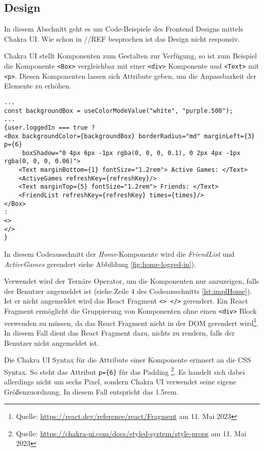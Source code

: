 \subsection{Design}
\label{sec:Design}
In diesem Abschnitt geht es um Code-Beispiele des Frontend Designs mittels Chakra UI.  Wie schon in //REF besprochen ist das Design nicht responsiv.

Chakra UI stellt Komponenten zum Gestalten zur Verfügung, so ist zum Beispiel die Komponente \verb|<Box>| vergleichbar mit einer \verb|<div>| Komponente und \verb|<Text>| mit \verb|<p>|. Diesen Komponenten lassen sich Attribute geben, um die Anpassbarkeit der Elemente zu erhöhen.

\begin{lstlisting}[style=codeStyle, caption={Darstellung der \textit{Friendlist} und \textit{ActiveGames} Komponenten in der \textit{Home}-Komponente}, label={lst:impl-Home}]
...
const backgroundBox = useColorModeValue("white", "purple.500");
...
{user.loggedIn === true ?
<Box backgroundColor={backgroundBox} borderRadius="md" marginLeft={3} p={6}
     boxShadow="0 4px 6px -1px rgba(0, 0, 0, 0.1), 0 2px 4px -1px rgba(0, 0, 0, 0.06)">
    <Text marginBottom={1} fontSize="1.2rem"> Active Games: </Text>
    <ActiveGames refreshKey={refreshKey}/>
    <Text marginTop={5} fontSize="1.2rem"> Friends: </Text>
    <FriendList refreshKey={refreshKey} times={times}/>
</Box>
:
<>
</>
}
\end{lstlisting}

In diesem Codeausschnitt der \textit{Home}-Komponente wird die \textit{FriendList} und \textit{ActiveGames} gerendert siehe Abbildung \ref{fig:home-logged-in}).

Verwendet wird der Ternäre Operator, um die Komponenten nur anzuzeigen, falls der Benutzer angemeldet ist (siehe Zeile 4 des Codeausschnitts \ref{lst:implHome}). Ist er nicht angemeldet wird das React Fragment \verb|<> </>| gerendert. Ein React Fragment ermöglicht die Gruppierung von Komponenten ohne einen \verb|<div>| Block verwenden zu müssen, da das React Fragment nicht in der DOM gerendert wird\footnote{Quelle: \url{https://react.dev/reference/react/Fragment} am 11. Mai 2023}.  In diesem Fall dient das React Fragment dazu, nichts zu rendern, falls der Benutzer nicht angemeldet ist.

Die Chakra UI Syntax für die Attribute einer Komponente erinnert an die CSS Syntax. So steht das Attribut \verb|p={6}| für das Padding \footnote{Quelle: \url{https://chakra-ui.com/docs/styled-system/style-props} am 11. Mai 2023}. Es handelt sich dabei allerdings nicht um sechs Pixel, sondern Chakra UI verwendet seine eigene Größenzuordnung. In diesem Fall entspricht das 1.5rem.

